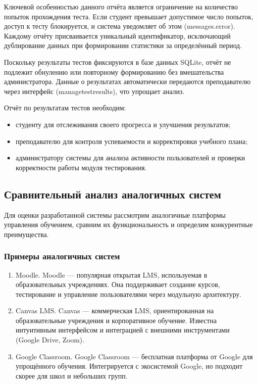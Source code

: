 Ключевой особенностью данного отчёта является ограничение на количество попыток прохождения теста. Если студент превышает допустимое число попыток, доступ к тесту блокируется, и система уведомляет об этом (messages.error). Каждому отчёту присваивается уникальный идентификатор, исключающий дублирование данных при формировании статистики за определённый период.

Поскольку результаты тестов фиксируются в базе данных SQLite, отчёт не подлежит обнулению или повторному формированию без вмешательства администратора. Данные о результатах автоматически передаются преподавателю через интерфейс (managetestresults), что упрощает анализ. 

Отчёт по результатам тестов необходим: 

\begin{itemize}
	\item студенту для отслеживания своего прогресса и улучшения результатов; 
	\item преподавателю для контроля успеваемости и корректировки учебного плана; 
	\item администратору системы для анализа активности пользователей и проверки корректности работы модуля тестирования.
\end{itemize}

\subsection{Сравнительный анализ аналогичных систем}

Для оценки разработанной системы рассмотрим аналогичные платформы управления обучением, сравним их функциональность и определим конкурентные преимущества.

\subsubsection{Примеры аналогичных систем}

\begin{enumerate}
	\item {Moodle.} Moodle --- популярная открытая LMS, используемая в образовательных учреждениях. Она поддерживает создание курсов, тестирование и управление пользователями через модульную архитектуру.
	\item {Canvas LMS.} Canvas --- коммерческая LMS, ориентированная на образовательные учреждения и корпоративное обучение. Известна интуитивным интерфейсом и интеграцией с внешними инструментами (Google Drive, Zoom).
	\item {Google Classroom.} Google Classroom --- бесплатная платформа от Google для упрощённого обучения. Интегрируется с экосистемой Google, но подходит скорее для школ и небольших групп.
\end{enumerate}

